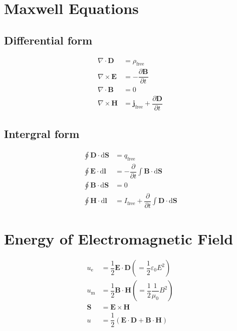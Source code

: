 \documentclass[10pt, a4paper]{article}
\def\D{\partial}
\def\epsilon{\varepsilon}
\begin{document}
\section{Maxwell Equations}

\begin{multicols}{2}

\subsection{Differential form}

	\begin{align}
		\nabla \cdot \bm{D} &= \rho_\text{free}\\
		\nabla \times \bm{E} &= -\dfrac{\D \bm{B}}{\D t}\\
		\nabla \cdot \bm{B} &= 0\\
		\nabla \times \bm{H} &= \bm{j}_\text{free} + \dfrac{\D \bm{D}}{\D t}
	\end{align}
	
\subsection{Intergral form}

	\begin{align}
		\oint \bm{D} \cdot \mathrm{d} \bm{S} &= q_\text{free}\\
		\oint \bm{E} \cdot \mathrm{d} \bm{l} &= -\dfrac{\D }{\D t}\int \bm{B} \cdot \mathrm{d} \bm{S}\\
		\oint \bm{B} \cdot \mathrm{d} \bm{S} &= 0\\
		\oint \bm{H} \cdot \mathrm{d} \bm{l} &= I_\text{free} + \dfrac{\D }{\D t}\int \bm{D} \cdot \mathrm{d} \bm{S}
	\end{align}
	
\end{multicols}


\section{Energy of Electromagnetic Field}

	\begin{align}
		u_\text{e} &= \dfrac{1}{2} \bm{E} \cdot \bm{D} \left(= \dfrac{1}{2} \epsilon_0 E^2\right)\\
		u_\text{m} &= \dfrac{1}{2} \bm{B} \cdot \bm{H} \left(= \dfrac{1}{2} \dfrac{1}{\mu_0} B^2\right)\\
		\bm{S} &= \bm{E} \times \bm{H}\\
		u &= \dfrac{1}{2}\left(\bm{E} \cdot \bm{D} + \bm{B} \cdot \bm{H}\right)
	\end{align}
\end{document}
